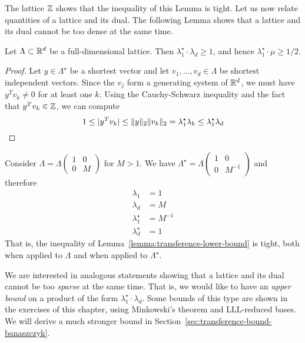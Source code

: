 The lattice $\mathbb{Z}$ shows that the inequality of this Lemma is tight.
Let us now relate quantities of a lattice and its dual.
The following Lemma shows that a lattice and its dual cannot be too dense at the same time.

\begin{lemma}
  \label{lemma:transference-lower-bound}
  Let $\Lambda \subset \mathbb{R}^d$ be a full-dimensional lattice.
  Then $\lambda_1^\star \cdot \lambda_d \geq 1$,
  and hence $\lambda_1^\star \cdot \mu \geq 1/2$.
\end{lemma}
\begin{proof}
  Let $y \in \Lambda^\star$ be a shortest vector
  and let $v_1, \ldots, v_d \in \Lambda$ be shortest independent vectors.
  Since the $v_j$ form a generating system of $\mathbb{R}^d$,
  we must have $y^T v_k \neq 0$ for at least one $k$.
  Using the Cauchy-Schwarz inequality and the fact that $y^T v_k \in \mathbb{Z}$,
  we can compute
  \[
    1 \leq |y^T v_k| \leq \|y\|_2 \|v_k\|_2 = \lambda_1^\star \lambda_k \leq \lambda_1^\star \lambda_d \qedhere
  \]
\end{proof}

\begin{example}
  Consider $\Lambda = \Lambda \begin{pmatrix} 1 & 0 \\ 0 & M \end{pmatrix}$ for $M > 1$.
  We have $\Lambda^\star = \Lambda \begin{pmatrix} 1 & 0 \\ 0 & M^{-1} \end{pmatrix}$
  and therefore
  \begin{align*}
    \lambda_1 &= 1 \\
    \lambda_d &= M \\
    \lambda_1^\star &= M^{-1} \\
    \lambda_d^\star &= 1
  \end{align*}
  That is, the inequality of Lemma~\ref{lemma:transference-lower-bound} is tight,
  both when applied to $\Lambda$ and when applied to $\Lambda^\star$.
\end{example}

We are interested in analogous statements showing
that a lattice and its dual cannot be too \emph{sparse} at the same time.
That is, we would like to have an \emph{upper bound} on a product of the form $\lambda_1^\star \cdot \lambda_d$.
Some bounds of this type are shown in the exercises of this chapter,
using Minkowski's theorem and LLL-reduced bases.
We will derive a much stronger bound in Section~\ref{sec:transference-bound-banaszczyk}.



